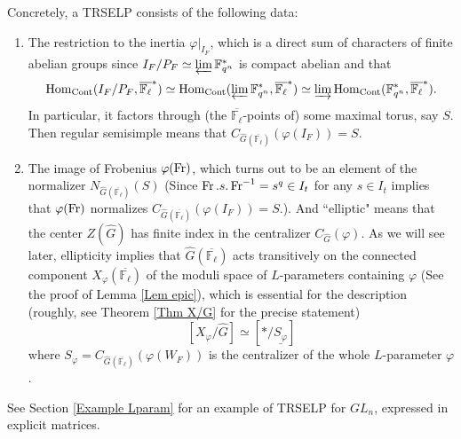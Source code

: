     Concretely, a TRSELP consists of the following data:
    
    \begin{enumerate}
    	\item The restriction to the inertia $\varphi|_{I_F}$, which is a direct sum of characters of finite abelian groups since $I_F/P_F \simeq \varprojlim\mathbb{F}_{q^n}^*$ is compact abelian and that
    	$$\operatorname{\operatorname{Hom}}_{\operatorname{Cont}}(I_F/P_F, \overline{\mathbb{F}_{\ell}}^*) \simeq \operatorname{\operatorname{Hom}}_{\operatorname{Cont}}(\varprojlim\mathbb{F}_{q^n}^*, \overline{\mathbb{F}_{\ell}}^*) \simeq \varinjlim\operatorname{\operatorname{Hom}}_{\operatorname{Cont}}(\mathbb{F}_{q^n}^*, \overline{\mathbb{F}_{\ell}}^*).$$
    	In particular, it factors through (the $\overline{\mathbb{F}_{\ell}}$-points of) some maximal torus, say $S$. Then regular semisimple means that $C_{\hat{G}(\overline{\mathbb{F}_{\ell}})}(\varphi(I_F))=S$.
    	\item The image of Frobenius $\varphi(\operatorname{Fr})$, which turns out to be an element of the normalizer $N_{\hat{G}(\overline{\mathbb{F}_{\ell}})}(S)$ (Since $\operatorname{Fr}.s.\operatorname{Fr}^{-1}=s^q \in I_t$ for any $s \in I_t$ implies that $\varphi(\operatorname{Fr})$ normalizes $C_{\hat{G}(\overline{\mathbb{F}_{\ell}})}(\varphi(I_F))=S$.). 
        And ``elliptic" means that the center $Z(\hat{G})$ has finite index in the centralizer $C_{\hat{G}}(\varphi)$. As we will see later, ellipticity implies that $\hat{G}(\overline{\mathbb{F}_{\ell}})$ acts transitively on the connected component $X_{\varphi}(\overline{\mathbb{F}_{\ell}})$ of the moduli space of $L$-parameters containing $\varphi$ (See the proof of Lemma \ref{Lem epic}), which is essential for the description (roughly, see Theorem \ref{Thm X/G} for the precise statement)
    	$$[X_{\varphi}/\hat{G}] \simeq [*/\underline{S_{\varphi}}]$$
    	where $S_\varphi=C_{\hat{G}(\overline{\mathbb{F}_{\ell}})}(\varphi(W_F))$ is the centralizer of the whole $L$-parameter $\varphi$.
    \end{enumerate}

    See Section \ref{Example Lparam} for an example of TRSELP for $GL_n$, expressed in explicit matrices.

